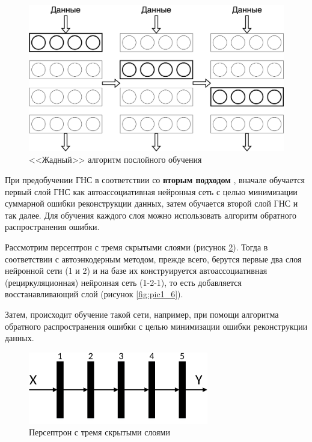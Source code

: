 \begin{figure}[H]
  \centering
  \includegraphics[width=\textwidth]{man-source/images/ch1/pic1-4.png}
  \caption{<<Жадный>> алгоритм послойного обучения}
  \label{fig:pic1_4}
\end{figure}


При предобучении ГНС в соответствии со \textbf{вторым подходом} \cite{n6}, вначале обучается первый слой ГНС как автоассоциативная нейронная сеть с целью минимизации суммарной ошибки реконструкции данных, затем обучается второй слой ГНС и так далее. Для обучения каждого слоя можно использовать алгоритм обратного распространения ошибки. 

	
Рассмотрим персептрон с тремя скрытыми слоями (рисунок \ref{fig:pic1_5}). Тогда в соответствии с автоэнкодерным методом, прежде всего, берутся первые два слоя нейронной сети (1 и 2) и на базе их конструируется автоассоциативная (рециркуляционная) нейронная сеть (1-2-1), то есть добавляется восстанавливающий слой (рисунок \ref{fig:pic1_6}). 

Затем, происходит обучение такой сети, например, при помощи алгоритма обратного распространения ошибки с целью минимизации ошибки реконструкции данных. 
	
\begin{figure}[H]
  \centering
  \includegraphics[width=0.7\textwidth]{man-source/images/ch1/pic1-5.pdf}
  \caption{Персептрон с тремя скрытыми слоями}
  \label{fig:pic1_5}
\end{figure}	

